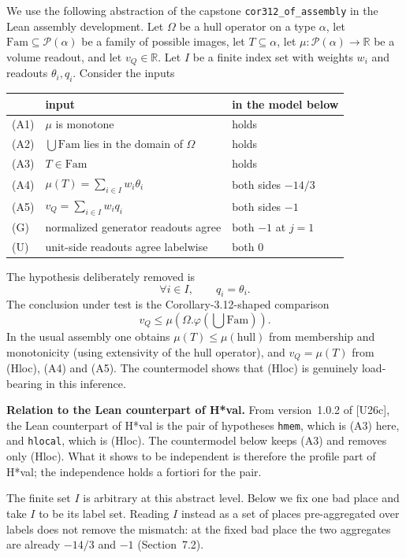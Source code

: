 \documentclass[11pt]{article}
\newcommand{\Fam}{\mathrm{Fam}}
\theoremstyle{definition}
\begin{document}
We use the following abstraction of the capstone
\texttt{cor312\_of\_assembly} in the Lean assembly development.
Let $\Omega$ be a hull operator on a type $\alpha$, let
$\Fam\subseteq\mathcal P(\alpha)$ be a family of possible images,
let $T\subseteq\alpha$, let
$\mu:\mathcal P(\alpha)\to\mathbb R$ be a volume readout, and let
$v_Q\in\mathbb R$.  Let $I$ be a finite index set with weights
$w_i$ and readouts $\theta_i,q_i$.  Consider the inputs
\begin{center}
\begin{tabular}{lll}
\toprule
 & input & in the model below\\
\midrule
(A1) & $\mu$ is monotone & holds\\
(A2) & $\bigcup\Fam$ lies in the domain of $\Omega$ & holds\\
(A3) & $T\in\Fam$ & holds\\
(A4) & $\mu(T)=\sum_{i\in I}w_i\theta_i$ & both sides $-14/3$\\
(A5) & $v_Q=\sum_{i\in I}w_iq_i$ & both sides $-1$\\
(G)  & normalized generator readouts agree & both $-1$ at $j=1$\\
(U)  & unit-side readouts agree labelwise & both $0$\\
\bottomrule
\end{tabular}
\end{center}
The hypothesis deliberately removed is
\[
\tag{Hloc}
\forall i\in I,\qquad q_i=\theta_i .
\]
The conclusion under test is the Corollary-3.12-shaped comparison
\[
\tag{C}
v_Q\leq
\mu\!\left(\Omega.\varphi\left(\bigcup\Fam\right)\right).
\]
In the usual assembly one obtains $\mu(T)\leq\mu(\mathrm{hull})$
from membership and monotonicity (using extensivity of the hull
operator), and $v_Q=\mu(T)$ from (Hloc), (A4) and (A5).  The
countermodel shows that (Hloc) is genuinely load-bearing in this
inference.

\textbf{Relation to the Lean counterpart of H*val.}  From
version~1.0.2 of [U26c], the Lean counterpart of H*val is the pair of
hypotheses \texttt{hmem}, which is (A3) here, and \texttt{hlocal},
which is (Hloc).  The countermodel below keeps (A3) and removes only
(Hloc).  What it shows to be independent is therefore the profile part
of H*val; the independence holds a fortiori for the pair.

The finite set $I$ is arbitrary at this abstract level.  Below we
fix one bad place and take $I$ to be its label set.  Reading $I$
instead as a set of places pre-aggregated over labels does not
remove the mismatch: at the fixed bad place the two aggregates
are already $-14/3$ and $-1$ (Section~7.2).
\end{document}
